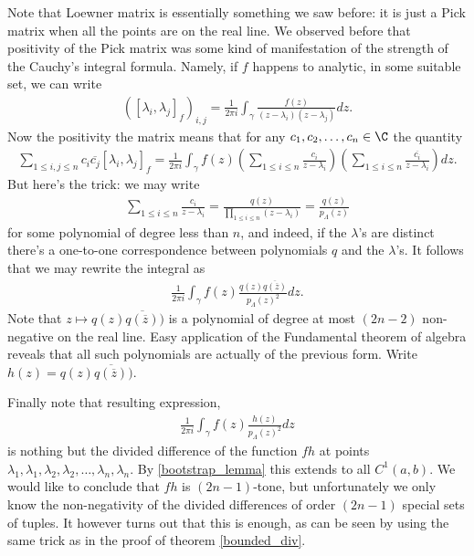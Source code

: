 Note that Loewner matrix is essentially something we saw before: it is just a Pick matrix when all the points are on the real line. We observed before that positivity of the Pick matrix was some kind of manifestation of the strength of the Cauchy's integral formula. Namely, if $f$ happens to analytic, in some suitable set, we can write
\begin{align*}
	\left([\lambda_{i}, \lambda_{j}]_{f}\right)_{i, j} = \frac{1}{2 \pi i}\int_{\gamma} \frac{f(z)}{(z - \lambda_{i})(z - \lambda_{j})} dz.
\end{align*}
Now the positivity the matrix means that for any $c_{1}, c_{2}, \ldots, c_{n} \in \C$ the quantity
\begin{align*}
	\sum_{1 \leq i, j \leq n} c_{i} \overline{c_{j}} [\lambda_{i}, \lambda_{j}]_{f} = \frac{1}{2 \pi i}\int_{\gamma}f(z) \left(\sum_{1 \leq i \leq n} \frac{c_{i}}{z - \lambda_{i}}\right) \left( \sum_{1 \leq i \leq n} \frac{\overline{c_{i}}}{z - \lambda_{i}}\right)dz.
\end{align*}
But here's the trick: we may write
\begin{align*}
	\sum_{1 \leq i \leq n} \frac{c_{i}}{z - \lambda_{i}} = \frac{q(z)}{\prod_{1 \leq i \leq n} (z - \lambda_{i})} = \frac{q(z)}{p_{\Lambda}(z)}
\end{align*}
for some polynomial of degree less than $n$, and indeed, if the $\lambda$'s are distinct there's a one-to-one correspondence between polynomials $q$ and the $\lambda$'s. It follows that we may rewrite the integral as
\begin{align*}
\frac{1}{2 \pi i}\int_{\gamma}f(z) \frac{q(z) \overline{q(\overline{z})}}{p_{\Lambda}(z)^2}dz.
\end{align*}
Note that $z \mapsto q(z)\overline{q(\overline{z})})$ is a polynomial of degree at most $(2 n - 2)$ non-negative on the real line. Easy application of the Fundamental theorem of algebra reveals that all such polynomials are actually of the previous form. Write $h(z) = q(z)\overline{q(\overline{z})})$.

Finally note that resulting expression,
\begin{align*}
\frac{1}{2 \pi i}\int_{\gamma}f(z) \frac{h(z)}{p_{\Lambda}(z)^2}dz
\end{align*}
is nothing but the divided difference of the function $f h$ at points $\lambda_{1}, \lambda_{1}, \lambda_{2}, \lambda_{2}, \ldots, \lambda_{n}, \lambda_{n}$. By \ref{bootstrap_lemma} this extends to all $C^{1}(a, b)$. We would like to conclude that $f h$ is $(2 n - 1)$-tone, but unfortunately we only know the non-negativity of the divided differences of order $(2 n - 1)$ special sets of tuples. It however turns out that this is enough, as can be seen by using the same trick as in the proof of theorem \ref{bounded_div}.

